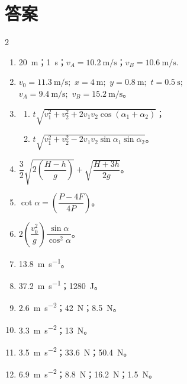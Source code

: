 

\chapter*{答案}
{}
\label{answers}

\begin{fullwidth}
\begin{multicols}{2}
\begin{enumerate}[label=\arabic*.]
\item \SI{20}{\metre}；\SI{1}{\second}；$v_{A} = \SI[per-mode=symbol]{10.2}{\metre\per\second}$；$v_{B} = \SI[per-mode=symbol]{10.6}{\metre\per\second}.$
\item $v_{0}= \SI[per-mode=symbol]{11.3}{\metre\per\second}; \,\, x = \SI{4}{\metre}; \,\, y =  \SI{0.8}{\metre}; \,\, t = \SI{0.5}{\second};$\\
$ v_{A}=\SI[per-mode=symbol]{9.4}{\metre\per\second}; \,\,v_{B}=\SI[per-mode=symbol]{15.2}{\metre\per\second}$。
\item
\begin{enumerate}[label=(\arabic*)]
\item $t \sqrt{v_{1}^{2} + v_{2}^{2} + 2v_{1}v_{2} \cos (\alpha_{1} + \alpha_{2})}$；
\item $t \sqrt{v_{1}^{2} + v_{2}^{2} - 2v_{1}v_{2} \sin \alpha_{1} \sin \alpha_{2} }$。
\end{enumerate}
\item $\dfrac{3}{2} \sqrt{2 \left( \dfrac{H-h}{g} \right)} + \sqrt{\dfrac{H+3h}{2g}}$。
\item $\cot \alpha = \left( \dfrac{P-4F}{4P} \right)$。
\item $ 2 \left( \dfrac{v_{0}^{2}}{g} \right) \dfrac{\sin \alpha}{\cos^{2} \alpha}$。
\item \SI[per-mode=symbol]{13.8}{\metre\per\second}。
\item \SI[per-mode=symbol]{37.2}{\metre\per\second}；\SI{1280}{\joule}。
\item \SI[per-mode=symbol]{2.6}{\metre\per\second\squared}；\SI{42}{\newton}；\SI{8.5}{\newton}。
\item \SI[per-mode=symbol]{3.3}{\metre\per\second\squared}；\SI{13}{\newton}。
\item \SI[per-mode=symbol]{3.5}{\metre\per\second\squared}；\SI{33.6}{\newton}；\SI{50.4}{\newton}。
\item \SI[per-mode=symbol]{6.9}{\metre\per\second\squared}；\SI{8.8}{\newton}；\SI{16.2}{\newton}；\SI{1.5}{\newton}。

\end{enumerate}
\end{multicols}
\end{fullwidth}
